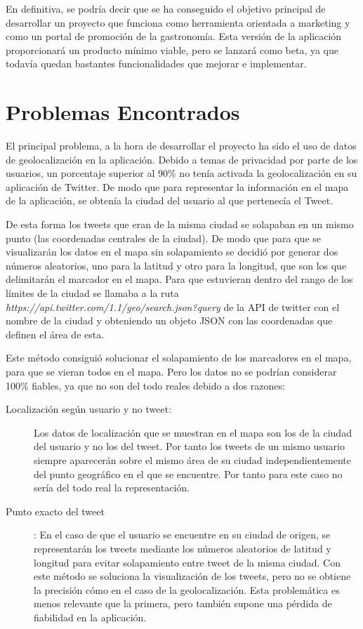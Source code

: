 En definitiva, se podría decir que se ha conseguido el objetivo principal de desarrollar un proyecto que funciona como herramienta orientada a marketing y
como un portal de promoción de la gastronomía. Esta versión de la aplicación proporcionará un producto mínimo viable, pero se lanzará como beta, ya que
todavía quedan bastantes funcionalidades que mejorar e implementar.

\section{Problemas Encontrados}

El principal problema, a la hora de desarrollar el proyecto ha sido el uso de datos de geolocalización en la aplicación. Debido a temas de privacidad por parte de los usuarios, un porcentaje superior al 90\% no tenía activada la geolocalización en su aplicación de Twitter.
De modo que para representar la información en el mapa de la aplicación, se obtenía la ciudad del usuario al que pertenecía el Tweet.

\vspace{5 mm}

De esta forma los tweets que eran de la misma ciudad se solapaban en un mismo punto (las coordenadas centrales de la ciudad). De modo que para que se visualizarán los datos en el mapa sin solapamiento se
decidió por generar dos números aleatorios, uno para la latitud y otro para la longitud, que son los que delimitarán el marcador en el mapa. Para que estuvieran dentro del rango de los límites de la ciudad
se llamaba a la ruta \emph{https://api.twitter.com/1.1/geo/search.json?query} de la API de twitter con el nombre de la ciudad y obteniendo un objeto JSON con las coordenadas que definen el área
de esta.


Este método consiguió solucionar el solapamiento de los marcadores en el mapa, para que se vieran todos en el mapa. Pero los datos no se podrían considerar 100\% fiables, ya que no son del todo reales
debido a dos razones:


\begin{description}

\item [Localización según usuario y no tweet:] Los datos de localización que se muestran en el mapa son los de la ciudad del usuario y no los del tweet. Por tanto
los tweets de un mismo usuario siempre aparecerán sobre el mismo área de su ciudad independientemente del punto geográfico en el que se encuentre. Por tanto
para este caso no sería del todo real la representación.

\item [Punto exacto del tweet]: En el caso de que el usuario se encuentre en su ciudad de origen, se representarán los tweets mediante los números aleatorios de latitud
y longitud para evitar solapamiento entre tweet de la misma ciudad. Con este método se soluciona la visualización de los tweets, pero no se obtiene la precisión cómo
en el caso de la geolocalización. Esta problemática es menos relevante que la primera, pero también supone una pérdida de fiabilidad en la aplicación.

\end{description}


